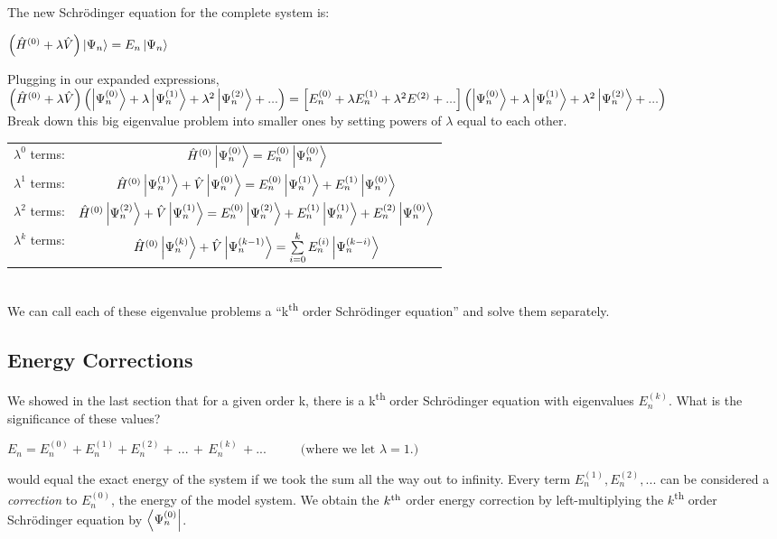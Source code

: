 \documentclass{article}
\newcommand{\vsp}{\vspace{0.2cm}}
\newcommand{\suml}{\ensuremath{\sum\limits}}
\newcommand{\z}{\ensuremath{^{(0)}}}
\newcommand{\one}{\ensuremath{^{(1)}}}
\newcommand{\two}{\ensuremath{^{(2)}}}
\newcommand{\tss}{\textsuperscript}
\begin{document}
The new Schr{\"o}dinger equation for the complete system is:
\begin{center}     $\left(\hat{H}^{(0)} + \lambda \hat{V}\right)  \Ket{\Psi_n} = E_n \Ket{\Psi_n} $     \end{center}
Plugging in our expanded expressions,  \vsp  \\
$\left( \hat{H}^{(0)} + \lambda \hat{V}  \right) \left( \Ket{\Psi^{(0)}_n} + \lambda \Ket{\Psi^{(1)}_n} + \lambda^2 \Ket{\Psi^{(2)}_n} + ... \right) = \left[ E\z_n + \lambda E\one_n + \lambda^2 E\two  + ... \right] \left( \Ket{\Psi^{(0)}_n} + \lambda \Ket{\Psi^{(1)}_n} + \lambda^2 \Ket{\Psi^{(2)}_n} + ... \right) $ \vsp \\
Break down this big eigenvalue problem into smaller ones by setting powers of $\lambda$ equal to each other. \vsp  \vsp \\
\begin{tabular}{cc}
$\lambda^0$  terms:      &  $\hat{H}^{(0)} \Ket{\Psi^{(0)}_n} =  E^{(0)}_n \Ket{\Psi^{(0)}_n}$   \vsp \\
$\lambda^1$   terms:     &   $\hat{H}^{(0)} \Ket{\Psi^{(1)}_n} + \hat{V} \Ket{\Psi^{(0)}_n} =  E^{(0)}_n \Ket{\Psi^{(1)}_n} + E^{(1)}_n \Ket{\Psi^{(0)}_n}$  \vsp  \\
$\lambda^2$  terms: & $\hat{H}^{(0)} \Ket{\Psi^{(2)}_n}+\hat{V} \Ket{\Psi^{(1)}_n}=E^{(0)}_n\Ket{\Psi\two_n} +E\one_n \Ket{\Psi^{(1)}_n}+ E^{(2)}_n \Ket{\Psi^{(0)}_n}$ \vsp \\
$\lambda^k$  terms:     &  $\hat{H}^{(0)} \Ket{\Psi^{(k)}_n} + \hat{V} \Ket{\Psi^{(k-1)}_n}  =  \suml_{i=0}^k E^{(i)}_n \Ket{\Psi^{(k-i)}_n} $ \\
\end{tabular} \vsp \\
We can call each of these eigenvalue problems a ``k\tss{th} order Schr{\"o}dinger equation'' and solve them separately.


\newpage

\subsection{Energy Corrections}
We showed in the last section that for a given order k, there is a k\tss{th} order Schr{\"o}dinger equation with eigenvalues $E^{(k)}_n$. What is the significance of these values? 
\begin{center}
$E_n =  E_n^{(0)} + E_n^{(1)} + E_n^{(2)} + \,  ... \,  + \, E_n^{(k)} \, + ... \hspace{1cm} \text{ (where we let $\lambda=1$.)}$
\end{center}
would equal the exact energy of the system if we took the sum all the way out to infinity. Every term $E_n^{(1)}, E_n^{(2)}, ... $ can be considered a {\it correction} to $E_n^{(0)}$, the energy of the model system. We obtain the $k\tss{th}$ order energy correction by left-multiplying the $k$\tss{th} order Schr{\"odinger} equation by $\Bra{\Psi^{(0)}_n}$. \vsp
\end{document}
